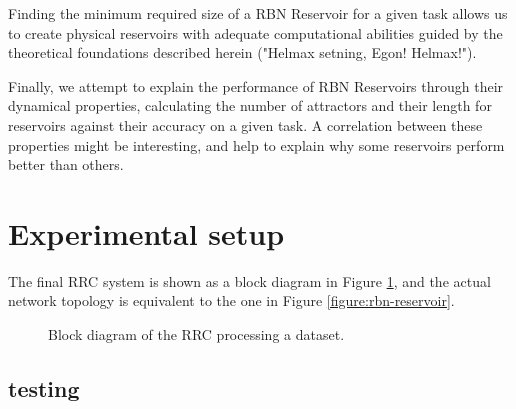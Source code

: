 Finding the minimum required size of a RBN Reservoir for a given task allows us to create physical reservoirs with adequate computational abilities guided by the theoretical foundations described herein ("Helmax setning, Egon! Helmax!").

Finally, we attempt to explain the performance of RBN Reservoirs through their dynamical properties,
calculating the number of attractors and their length for reservoirs against their accuracy on a given task.
A correlation between these properties might be interesting, and help to explain why some reservoirs perform better than others.

\section{Experimental setup}

The final RRC system is shown as a block diagram in Figure \ref{figure:rrc-block},
and the actual network topology is equivalent to the one in Figure \ref{figure:rbn-reservoir}.



\begin{figure}
    \centering
    \caption{Block diagram of the RRC processing a dataset.}
    \label{figure:rrc-block}
\end{figure}

\subsection{testing}

